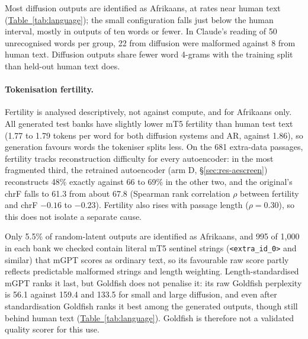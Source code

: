 \documentclass[11pt,a4paper]{article}
\begin{document}
Most diffusion outputs are identified as Afrikaans, at rates near human text (\hyperref[tab:language]{Table~\ref*{tab:language}}); the small configuration falls just below the human interval, mostly in outputs of ten words or fewer. In Claude's reading of 50 unrecognised words per group, 22 from diffusion were malformed against 8 from human text. Diffusion outputs share fewer word 4-grams with the training split than held-out human text does.

\paragraph{Tokenisation fertility.} Fertility is analysed descriptively, not against compute, and for Afrikaans only. All generated test banks have slightly lower mT5 fertility \citep{rust2021good,lundin2025token} than human test text (1.77 to 1.79 tokens per word for both diffusion systems and AR, against 1.86), so generation favours words the tokeniser splits less. On the 681 extra-data passages, fertility tracks reconstruction difficulty for every autoencoder: in the most fragmented third, the retrained autoencoder (arm D, \S\ref{sec:res-aescreen}) reconstructs 48\% exactly against 66 to 69\% in the other two, and the original's chrF falls to 61.3 from about 67.8 (Spearman rank correlation $\rho$ between fertility and chrF $-0.16$ to $-0.23$). Fertility also rises with passage length ($\rho=0.30$), so this does not isolate a separate cause.

Only 5.5\% of random-latent outputs are identified as Afrikaans, and 995 of 1,000 in each bank we checked contain literal mT5 sentinel strings (\texttt{<extra\_id\_0>} and similar) that mGPT scores as ordinary text, so its favourable raw score partly reflects predictable malformed strings and length weighting. Length-standardised mGPT ranks it last, but Goldfish does not penalise it: its raw Goldfish perplexity is 56.1 against 159.4 and 133.5 for small and large diffusion, and even after standardisation Goldfish ranks it best among the generated outputs, though still behind human text (\hyperref[tab:language]{Table~\ref*{tab:language}}). Goldfish is therefore not a validated quality scorer for this use.
\end{document}
